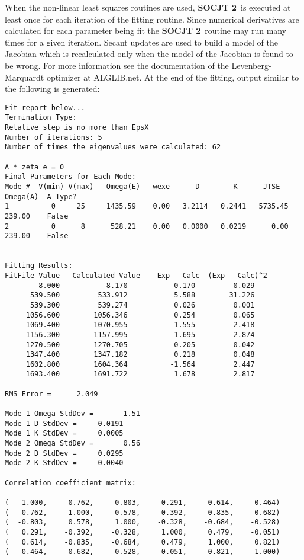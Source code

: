 \documentclass{article}
\newcommand{\socjttwo}{{\bf SOCJT 2}}
\begin{document}
When the non-linear least squares routines are used, \socjttwo\ is
executed at least once for each iteration of the fitting routine. Since numerical derivatives are calculated for each parameter being fit the \socjttwo\ routine may run many times for a given iteration. Secant updates are used to build a model of the Jacobian which is recalculated only when the model of the Jacobian is found to be wrong. For more information see the documentation of the Levenberg-Marquardt optimizer at ALGLIB.net\cite{alglib}. At the end of
the fitting, output similar to the following is generated:
\begin{verbatim}
Fit report below...
Termination Type: 
Relative step is no more than EpsX 
Number of iterations: 5
Number of times the eigenvalues were calculated: 62
 
A * zeta e = 0
Final Parameters for Each Mode:
Mode #  V(min) V(max)   Omega(E)   wexe      D        K      JTSE   Omega(A)  A Type?
1          0     25     1435.59    0.00   3.2114   0.2441   5735.45   239.00    False
2          0      8      528.21    0.00   0.0000   0.0219      0.00   239.00    False
  
  
Fitting Results:
FitFile Value	Calculated Value	Exp - Calc	(Exp - Calc)^2
        8.000	        8.170		   -0.170	      0.029
      539.500	      533.912		    5.588	     31.226
      539.300	      539.274		    0.026	      0.001
     1056.600	     1056.346		    0.254	      0.065
     1069.400	     1070.955		   -1.555	      2.418
     1156.300	     1157.995		   -1.695	      2.874
     1270.500	     1270.705		   -0.205	      0.042
     1347.400	     1347.182		    0.218	      0.048
     1602.800	     1604.364		   -1.564	      2.447
     1693.400	     1691.722		    1.678	      2.817
  
RMS Error =      2.049
  
Mode 1 Omega StdDev =       1.51
Mode 1 D StdDev =     0.0191
Mode 1 K StdDev =     0.0005
Mode 2 Omega StdDev =       0.56
Mode 2 D StdDev =     0.0295
Mode 2 K StdDev =     0.0040
 
Correlation coefficient matrix:

(   1.000,    -0.762,    -0.803,     0.291,     0.614,     0.464)
(  -0.762,     1.000,     0.578,    -0.392,    -0.835,    -0.682)
(  -0.803,     0.578,     1.000,    -0.328,    -0.684,    -0.528)
(   0.291,    -0.392,    -0.328,     1.000,     0.479,    -0.051)
(   0.614,    -0.835,    -0.684,     0.479,     1.000,     0.821)
(   0.464,    -0.682,    -0.528,    -0.051,     0.821,     1.000) 
\end{verbatim}
\end{document}
